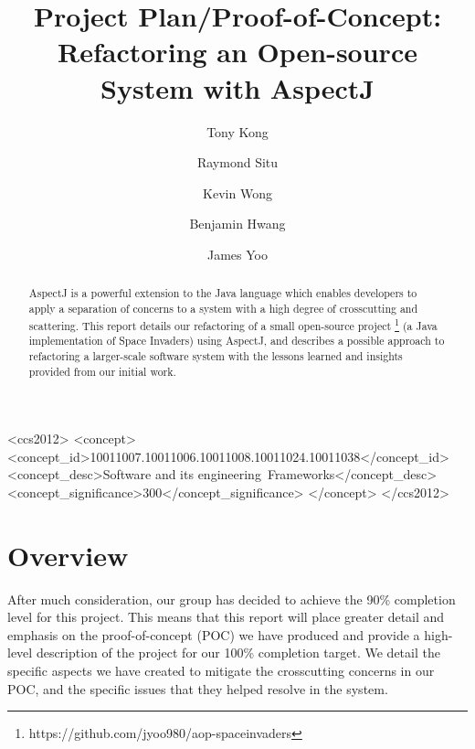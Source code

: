\documentclass[sigconf]{acmart}
\begin{document}
\title{Project Plan/Proof-of-Concept:\\ Refactoring an Open-source System with AspectJ}

\author{Tony Kong}

\author{Raymond Situ}

\author{Kevin Wong}

\author{Benjamin Hwang}

\author{James Yoo}

\begin{abstract}
AspectJ is a powerful extension to the Java language which enables developers to apply a separation of concerns to a system with a high degree of crosscutting and scattering. This report details our refactoring of a small open-source project \footnote{https://github.com/jyoo980/aop-spaceinvaders} (a Java implementation of Space Invaders) using AspectJ, and describes a possible approach to refactoring a larger-scale software system with the lessons learned and insights provided from our initial work.
\end{abstract}

\begin{CCSXML}
<ccs2012>
<concept>
<concept_id>10011007.10011006.10011008.10011024.10011038</concept_id>
<concept_desc>Software and its engineering~Frameworks</concept_desc>
<concept_significance>300</concept_significance>
</concept>
</ccs2012>
\end{CCSXML}

\maketitle

\section{Overview}
After much consideration, our group has decided to achieve the 90\% completion level for this project. This means that this report will place greater detail and emphasis on the proof-of-concept (POC) we have produced and provide a high-level description of the project for our 100\% completion target. We detail the specific aspects we have created to mitigate the crosscutting concerns in our POC, and the specific issues that they helped resolve in the system. 
\end{document}
